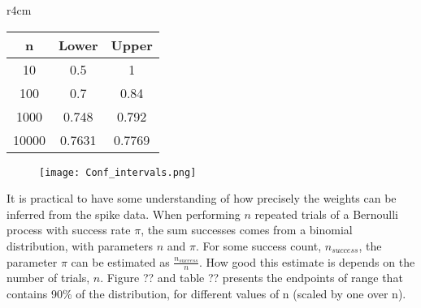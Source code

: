\begin{wraptable}{r}{4cm}
\begin{center}
 \begin{tabular}{||c c c ||} 
 \hline
 n & Lower & Upper \\ [0.5ex] 
 \hline\hline
 10 & 0.5 & 1 \\ 
 \hline
 100 & 0.7 & 0.84 \\
 \hline
 1000 & 0.748 & 0.792 \\
 \hline
 10000 & 0.7631 & 0.7769 \\ [1ex] 
 \hline
\end{tabular}
\end{center}
\end{wraptable}

\begin{figure}[h]
    \centering
    \texttt{[image: Conf\_intervals.png]}
\end{figure}

It is practical to have some understanding of how precisely the weights can be inferred from the spike data. When performing $n$ repeated trials of a Bernoulli process with success rate $\pi$, the sum successes comes from a binomial distribution, with parameters $n$ and $\pi$. For some success count, $n_{success}$, the parameter $\pi$ can be estimated as $\frac{n_{success}}{n}$. How good this estimate is depends on the number of trials, $n$. Figure ?? and table ?? presents the endpoints of range that contains 90\% of the distribution, for different values of n (scaled by one over n). 


